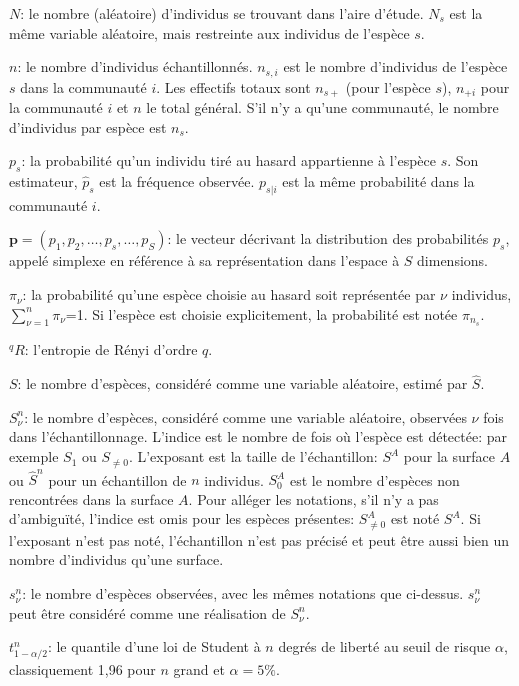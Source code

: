 \documentclass[
  11pt,
  french,
  a4paper,
  extrafontsizes,onecolumn,openright
  ]{memoir}
\newlength{\rf}
\begin{document}
\noindent \(N\): le nombre (aléatoire) d'individus se trouvant dans l'aire d'étude.
\(N_s\) est la même variable aléatoire, mais restreinte aux individus de l'espèce \(s\).

\noindent \(n\): le nombre d'individus échantillonnés.
\(n_{s,i}\) est le nombre d'individus de l'espèce \(s\) dans la communauté \(i\).
Les effectifs totaux sont \(n_{s+}\) (pour l'espèce \(s\)), \(n_{+i}\) pour la communauté \(i\) et \(n\) le total général.
S'il n'y a qu'une communauté, le nombre d'individus par espèce est \(n_s\).

\noindent \(p_s\): la probabilité qu'un individu tiré au hasard appartienne à l'espèce \(s\).
Son estimateur, \({\hat{p}}_s\) est la fréquence observée.
\(p_{s|i}\) est la même probabilité dans la communauté \(i\).

\noindent \(\mathbf{p}=\left( p_1, p_2, \dots, p_s, \dots, p_S \right)\): le vecteur décrivant la distribution des probabilités \(p_s\), appelé simplexe en référence à sa représentation dans l'espace à \(S\) dimensions.

\noindent \({\pi}_{\nu}\): la probabilité qu'une espèce choisie au hasard soit représentée par \(\nu\) individus, \(\sum^n_{\nu=1}{{\pi}_{\nu}}\)=1.
Si l'espèce est choisie explicitement, la probabilité est notée \({\pi}_{n_s}\).

\noindent \(^{q}\!R\): l'entropie de Rényi d'ordre \(q\).

\noindent \(S\): le nombre d'espèces, considéré comme une variable aléatoire, estimé par \(\hat{S}\).

\noindent \(S^{n}_{\nu}\): le nombre d'espèces, considéré comme une variable aléatoire, observées \(\nu\) fois dans l'échantillonnage.
L'indice est le nombre de fois où l'espèce est détectée: par exemple \(S_{1}\) ou \(S_{\ne 0}\).
L'exposant est la taille de l'échantillon: \(S^{A}\) pour la surface \(A\) ou \(\hat{S}^{n}\) pour un échantillon de \(n\) individus.
\(S^{A}_{0}\) est le nombre d'espèces non rencontrées dans la surface \(A\).
Pour alléger les notations, s'il n'y a pas d'ambiguïté, l'indice est omis pour les espèces présentes: \(S^{A}_{\ne 0}\) est noté \(S^{A}\).
Si l'exposant n'est pas noté, l'échantillon n'est pas précisé et peut être aussi bien un nombre d'individus qu'une surface.

\noindent \(s^{n}_{\nu}\): le nombre d'espèces observées, avec les mêmes notations que ci-dessus.
\(s^{n}_{\nu}\) peut être considéré comme une réalisation de \(S^{n}_{\nu}\).

\noindent \(t^{n}_{1-\alpha/2}\): le quantile d'une loi de Student à \(n\) degrés de liberté au seuil de risque \(\alpha\), classiquement 1,96 pour \(n\) grand et \(\alpha=5\%\).
\end{document}
